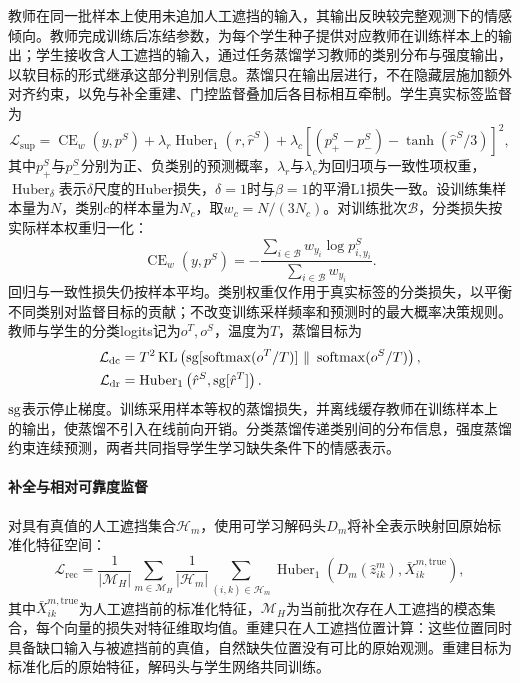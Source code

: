 教师在同一批样本上使用未追加人工遮挡的输入，其输出反映较完整观测下的情感倾向。教师完成训练后冻结参数，为每个学生种子提供对应教师在训练样本上的输出；学生接收含人工遮挡的输入，通过任务蒸馏\cite{ref:kd}学习教师的类别分布与强度输出，以软目标的形式继承这部分判别信息。蒸馏只在输出层进行，不在隐藏层施加额外对齐约束，以免与补全重建、门控监督叠加后各目标相互牵制。学生真实标签监督为
\begin{equation}
\mathcal L_{\mathrm{sup}}=\operatorname{CE}_w(y,p^S)
+\lambda_r\operatorname{Huber}_1(r,\hat r^S)
+\lambda_c\left[(p^S_{+}-p^S_{-})-\tanh(\hat r^S/3)\right]^2,
\end{equation}
其中$p^S_+$与$p^S_-$分别为正、负类别的预测概率，$\lambda_r$与$\lambda_c$为回归项与一致性项权重，$\operatorname{Huber}_\delta$表示$\delta$尺度的Huber损失，$\delta=1$时与$\beta=1$的平滑L1损失一致。设训练集样本量为$N$，类别$c$的样本量为$N_c$，取$w_c=N/(3N_c)$。对训练批次$\mathcal B$，分类损失按实际样本权重归一化：
\begin{equation}
\label{q2:eq:class_weight}
\operatorname{CE}_w(y,p^S)=-\frac{\sum_{i\in\mathcal B}w_{y_i}\log p^S_{i,y_i}}
{\sum_{i\in\mathcal B}w_{y_i}}.
\end{equation}
回归与一致性损失仍按样本平均。类别权重仅作用于真实标签的分类损失，以平衡不同类别对监督目标的贡献；不改变训练采样频率和预测时的最大概率决策规则。教师与学生的分类logits记为$o^T,o^S$，温度为$T$，蒸馏目标为
\begin{align}
\mathcal L_{\mathrm{dc}}&=T^2\operatorname{KL}\left(
\sg[\operatorname{softmax}(o^T/T)]\ \|\ \operatorname{softmax}(o^S/T)\right),\\
\mathcal L_{\mathrm{dr}}&=\operatorname{Huber}_1\left(\hat r^S,\sg[\hat r^T]\right).
\end{align}
$\operatorname{sg}$表示停止梯度。训练采用样本等权的蒸馏损失，并离线缓存教师在训练样本上的输出，使蒸馏不引入在线前向开销。分类蒸馏传递类别间的分布信息，强度蒸馏约束连续预测，两者共同指导学生学习缺失条件下的情感表示。

\paragraph{补全与相对可靠度监督}
对具有真值的人工遮挡集合$\mathcal H_m$，使用可学习解码头$D_m$将补全表示映射回原始标准化特征空间：
\begin{equation}
\mathcal L_{\mathrm{rec}}=\frac{1}{|\mathcal M_H|}\sum_{m\in\mathcal M_H}
\frac{1}{|\mathcal H_m|}\sum_{(i,k)\in\mathcal H_m}
\operatorname{Huber}_1\left(D_m(\hat z^m_{ik}),\bar X^{m,\mathrm{true}}_{ik}\right),
\end{equation}
其中$\bar X^{m,\mathrm{true}}_{ik}$为人工遮挡前的标准化特征，$\mathcal M_H$为当前批次存在人工遮挡的模态集合，每个向量的损失对特征维取均值。重建只在人工遮挡位置计算：这些位置同时具备缺口输入与被遮挡前的真值，自然缺失位置没有可比的原始观测。重建目标为标准化后的原始特征，解码头与学生网络共同训练。

